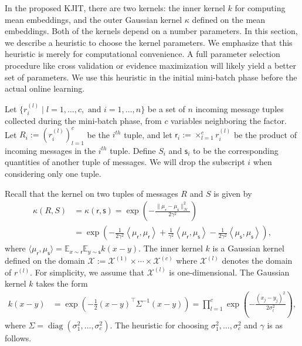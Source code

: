 \documentclass[english]{article}
\theoremstyle{plain}
\theoremstyle{plain}
\newcommand{\diag}{\mathop{\mathrm{diag}}}
\begin{document}
In the proposed KJIT, there are two kernels: the inner kernel $k$ for computing
mean embeddings, and the outer Gaussian kernel $\kappa$ defined on the mean
embeddings. Both of the kernels depend on a number parameters. In this section,
we describe a heuristic to choose the kernel parameters. We emphasize that this
heuristic is merely for computational convenience. A full parameter selection
procedure like cross validation or evidence maximization will likely yield a
better set of parameters. We use this heuristic in the initial mini-batch phase
before the actual online learning.

Let $\{ r^{(l)}_{i} \mid l= 1,\ldots, c, \text{ and } i=1,\ldots, n \}$ be a set 
of $n$ incoming message tuples collected during the mini-batch phase, from $c$ variables 
neighboring the factor. Let $R_i := (r^{(l)}_i)_{l=1}^c$ be the $i^{th}$ tuple, and 
let $\mathsf{r}_i := \times_{l=1}^c r^{(l)}_i$ be the product of incoming messages 
in the $i^{th}$ tuple. Define $S_i$ and $\mathsf{s}_i$ to be the corresponding 
quantities of another tuple of messages. We will drop the subscript $i$ when considering 
only one tuple.

Recall that the kernel on two tuples of messages $R$ and $S$ is given by 
\begin{align*}
\kappa(R, S) &= \kappa(\mathsf{r}, \mathsf{s}) =
\exp\left(-\frac{\|\mu_{\mathsf{r}}-
\mu_{\mathsf{s}} \|_{\mathcal{H}}^{2}}{2\gamma^{2}}\right)  \\
%
  &= \exp\left(-\frac{1}{2\gamma^{2}}\left\langle \mu_{\mathsf{r}},
  \mu_{\mathsf{r}}\right\rangle +\frac{1}{\gamma^{2}}\left\langle
  \mu_{\mathsf{r}}, \mu_{\mathsf{s}}\right\rangle
  -\frac{1}{2\gamma^{2}}\left\langle
  \mu_{\mathsf{s}},\mu_{\mathsf{s}}\right\rangle \right),
\end{align*}
%
where 
$\langle \mu_{\mathsf{r}},\mu_{\mathsf{s}}  \rangle
= \mathbb{E}_{x \sim \mathsf{r}} \mathbb{E}_{y \sim \mathsf{s}} 
k(x-y)$. 
The inner kernel $k$ is a Gaussian kernel defined on the domain 
$\mathcal{X} := \mathcal{X}^{(1)} \times \cdots \times \mathcal{X}^{(c)} $
where $\mathcal{X}^{(l)}$ denotes the domain of $r^(l)$. For simplicity, we assume 
that $\mathcal{X}^{(l)}$ is one-dimensional. The Gaussian kernel $k$ takes
the form 
%
\begin{align*}
k(x-y) &= \exp\left(-\frac{1}{2}\left(x-y\right)^{\top}
\Sigma^{-1}\left(x-y\right) \right) 
= \prod_{l=1}^c \exp \left( -\frac{(x_j - y_j)^2}{2 \sigma^2_l}  \right),
\end{align*}
% 
where $\Sigma = \diag(\sigma^2_1, \ldots, \sigma^2_c)$. The heuristic for choosing 
$\sigma^2_1, \ldots, \sigma^2_c$ and $\gamma$ is as follows. 
\end{document}
